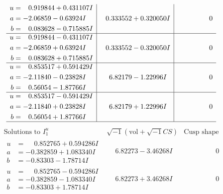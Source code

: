\documentclass[1p]{elsarticle_modified}
\theoremstyle{definition}
\newcommand{\I}{\sqrt{-1}}
\begin{document}
$$\begin{array}{c|c|c}
\begin{aligned}
u &= \phantom{-}0.919844 + 0.431107 I \\
a &= -2.06859 - 0.63924 I \\
b &= \phantom{-}0.083628 - 0.715885 I\end{aligned}
 & \phantom{-}0.333552 + 0.320050 I & \phantom{-0.000000 } 0 \\ \hline\begin{aligned}
u &= \phantom{-}0.919844 - 0.431107 I \\
a &= -2.06859 + 0.63924 I \\
b &= \phantom{-}0.083628 + 0.715885 I\end{aligned}
 & \phantom{-}0.333552 - 0.320050 I & \phantom{-0.000000 } 0 \\ \hline\begin{aligned}
u &= \phantom{-}0.853517 + 0.591429 I \\
a &= -2.11840 - 0.23828 I \\
b &= \phantom{-}0.56054 - 1.87766 I\end{aligned}
 & \phantom{-}6.82179 - 1.22996 I & \phantom{-0.000000 } 0 \\ \hline\begin{aligned}
u &= \phantom{-}0.853517 - 0.591429 I \\
a &= -2.11840 + 0.23828 I \\
b &= \phantom{-}0.56054 + 1.87766 I\end{aligned}
 & \phantom{-}6.82179 + 1.22996 I & \phantom{-0.000000 } 0\\
 \hline 
 \end{array}$$\newpage$$\begin{array}{c|c|c}  
\text{Solutions to }I^u_{1}& \I (\text{vol} + \sqrt{-1}CS) & \text{Cusp shape}\\
 \hline 
\begin{aligned}
u &= \phantom{-}0.852765 + 0.594286 I \\
a &= -0.382859 + 1.083340 I \\
b &= -0.83303 - 1.78714 I\end{aligned}
 & \phantom{-}6.82273 - 3.46268 I & \phantom{-0.000000 } 0 \\ \hline\begin{aligned}
u &= \phantom{-}0.852765 - 0.594286 I \\
a &= -0.382859 - 1.083340 I \\
b &= -0.83303 + 1.78714 I\end{aligned}
 & \phantom{-}6.82273 + 3.46268 I & \phantom{-0.000000 } 0 \\ \hline\begin{aligned}

\end{aligned}
\end{array}$$
\end{document}
